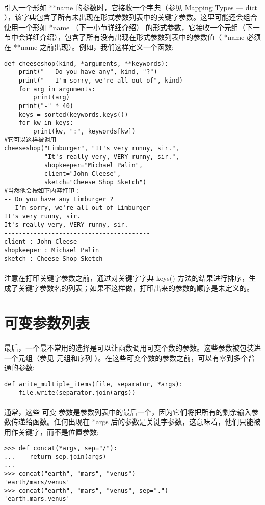 \documentclass{article}
\begin{document}
\begin{CJK}{UTF8}{gbsn}
\paragraph{}
引入一个形如 **name 的参数时，它接收一个字典（参见 Mapping Types — dict ），该字典包含了所有未出现在形式参数列表中的关键字参数。这里可能还会组合使用一个形如 *name （下一小节详细介绍） 的形式参数，它接收一个元组（下一节中会详细介绍），包含了所有没有出现在形式参数列表中的参数值（ *name 必须在 **name 之前出现）。例如，我们这样定义一个函数:
\begin{verbatim}
def cheeseshop(kind, *arguments, **keywords):
    print("-- Do you have any", kind, "?")
    print("-- I'm sorry, we're all out of", kind)
    for arg in arguments:
        print(arg)
    print("-" * 40)
    keys = sorted(keywords.keys())
    for kw in keys:
        print(kw, ":", keywords[kw])
#它可以这样被调用
cheeseshop("Limburger", "It's very runny, sir.",
           "It's really very, VERY runny, sir.",
           shopkeeper="Michael Palin",
           client="John Cleese",
           sketch="Cheese Shop Sketch")
#当然他会按如下内容打印：
-- Do you have any Limburger ?
-- I'm sorry, we're all out of Limburger
It's very runny, sir.
It's really very, VERY runny, sir.
----------------------------------------
client : John Cleese
shopkeeper : Michael Palin
sketch : Cheese Shop Sketch
\end{verbatim}
\paragraph{}
注意在打印关键字参数之前，通过对关键字字典 keys() 方法的结果进行排序，生成了关键字参数名的列表；如果不这样做，打印出来的参数的顺序是未定义的。
\section{可变参数列表}
\paragraph{}
最后，一个最不常用的选择是可以让函数调用可变个数的参数。这些参数被包装进一个元组（参见 元组和序列 ）。在这些可变个数的参数之前，可以有零到多个普通的参数:
\begin{verbatim}
def write_multiple_items(file, separator, *args):
    file.write(separator.join(args))
\end{verbatim}
\paragraph{}
通常，这些 可变 参数是参数列表中的最后一个，因为它们将把所有的剩余输入参数传递给函数。任何出现在 *args 后的参数是关键字参数，这意味着，他们只能被用作关键字，而不是位置参数:
\begin{verbatim}
>>> def concat(*args, sep="/"):
...    return sep.join(args)
...
>>> concat("earth", "mars", "venus")
'earth/mars/venus'
>>> concat("earth", "mars", "venus", sep=".")
'earth.mars.venus'
\end{verbatim}

\end{CJK}
\end{document}
